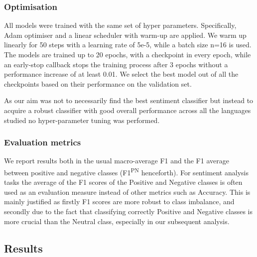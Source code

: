 \subsubsection{Optimisation} All models were trained with the same set of hyper parameters. Specifically, Adam optimiser \cite{loshchilov2017decoupled} and a linear scheduler with warm-up are applied. We warm up linearly for 50 steps with a learning rate of 5e-5, while a batch size n=16 is used. The models are trained up to 20 epochs, with a checkpoint in every epoch, while an early-stop callback stops the training process after 3 epochs without a performance increase of at least 0.01. We select the best model out of all the checkpoints based on their performance on the validation set.

As our aim was not to necessarily find the best sentiment classifier but instead to acquire a robust classifier with good overall performance across all the languages studied no hyper-parameter tuning was performed.

\vspace{-10pt}
\subsubsection{Evaluation metrics} 

We report results both in the usual macro-average F1 and the F1 average between positive and negative classes (F1\textsuperscript{PN} henceforth). For sentiment analysis tasks the average of the F1 scores of the Positive and Negative classes is often used as an evaluation measure \cite{rosenthal2017semeval} instead of other metrics such as Accuracy. This is mainly justified as firstly F1 scores are more robust to class imbalance, and secondly due to the fact that classifying correctly Positive and Negative classes is more crucial than the Neutral class, especially in our subsequent analysis.

\subsection{Results} 

